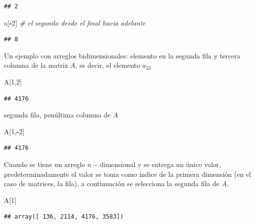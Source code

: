 \documentclass[
]{book}
\newenvironment{Shaded}{\begin{snugshade}}{\end{snugshade}}
\newcommand{\CommentTok}[1]{\textcolor[rgb]{0.56,0.35,0.01}{\textit{#1}}}
\newcommand{\DecValTok}[1]{\textcolor[rgb]{0.00,0.00,0.81}{#1}}
\newcommand{\NormalTok}[1]{#1}
\newcommand{\OperatorTok}[1]{\textcolor[rgb]{0.81,0.36,0.00}{\textbf{#1}}}
\theoremstyle{definition}
\theoremstyle{definition}
\theoremstyle{definition}
\theoremstyle{definition}
\theoremstyle{remark}
\begin{document}
\begin{verbatim}
## 2
\end{verbatim}

\begin{Shaded}
\begin{Highlighting}[]
\NormalTok{a[}\OperatorTok{{-}}\DecValTok{2}\NormalTok{] }\CommentTok{\# el segundo desde el final hacia adelante  }
\end{Highlighting}
\end{Shaded}

\begin{verbatim}
## 8
\end{verbatim}

Un ejemplo con arreglos bidimensionales: elemento en la segunda fila y tercera columna de la matriz \(A\), es decir, el elemento \(a_{23}\)

\begin{Shaded}
\begin{Highlighting}[]
\NormalTok{A[}\DecValTok{1}\NormalTok{,}\DecValTok{2}\NormalTok{]}
\end{Highlighting}
\end{Shaded}

\begin{verbatim}
## 4176
\end{verbatim}

segunda fila, penúltima columna de \(A\)

\begin{Shaded}
\begin{Highlighting}[]
\NormalTok{A[}\DecValTok{1}\NormalTok{,}\OperatorTok{{-}}\DecValTok{2}\NormalTok{] }
\end{Highlighting}
\end{Shaded}

\begin{verbatim}
## 4176
\end{verbatim}

Cuando se tiene un arreglo \(n-\)dimensional y se entrega un único valor, predeterminadamente el valor se toma como índice de la primera dimensión (en el caso de matrices, la fila), a continuación se selecciona la segunda fila de \(A\).

\begin{Shaded}
\begin{Highlighting}[]
\NormalTok{A[}\DecValTok{1}\NormalTok{] }
\end{Highlighting}
\end{Shaded}

\begin{verbatim}
## array([ 136, 2114, 4176, 3583])
\end{verbatim}
\end{document}
